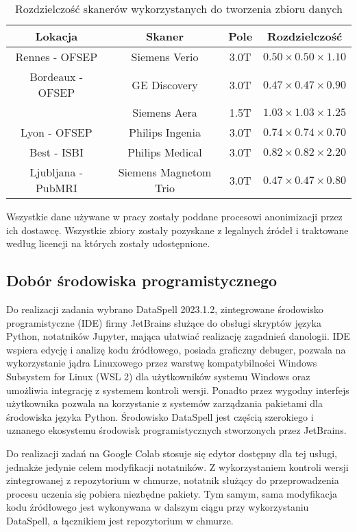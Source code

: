 \begin{table}[H]
    \centering
    \caption{Rozdzielczość skanerów wykorzystanych do tworzenia zbioru danych}
    \begin{tabular}{|c|c|c|c|}
    \hline
    Lokacja & Skaner & Pole & Rozdzielczość \\
    \hline
    Rennes - OFSEP & Siemens Verio & 3.0T & $0.50 \times 0.50 \times 1.10$  \\
    \hline
    Bordeaux - OFSEP & GE Discovery & 3.0T & $0.47 \times 0.47 \times 0.90$  \\

    & Siemens Aera & 1.5T & $1.03 \times 1.03 \times 1.25$  \\
    \hline
    Lyon - OFSEP & Philips Ingenia & 3.0T & $0.74 \times 0.74 \times 0.70$  \\
    \hline
    Best - ISBI & Philips Medical & 3.0T & $0.82 \times 0.82 \times 2.20$  \\
    \hline
    Ljubljana - PubMRI & Siemens Magnetom Trio & 3.0T & $0.47 \times 0.47 \times 0.80$  \\
    \hline
    \end{tabular}
    \label{tab:ResolutionOfDataset}
\end{table}

\par 
Wszystkie dane używane w pracy zostały poddane procesowi anonimizacji przez ich dostawcę.  
Wszystkie zbiory zostały pozyskane z legalnych źródeł i traktowane według licencji na których zostały udostępnione.




\subsection{Dobór środowiska programistycznego}
\label{sec:IDESelection}
\par
Do realizacji zadania wybrano DataSpell 2023.1.2, zintegrowane środowisko programistyczne (IDE) firmy JetBrains służące do obsługi skryptów języka Python, notatników Jupyter, mająca ułatwiać realizację zagadnień danologii. IDE wspiera edycję i analizę kodu źródłowego, posiada graficzny debuger, pozwala na wykorzystanie jądra Linuxowego przez warstwę kompatybilności Windows Subsystem for Linux (WSL 2) dla użytkowników systemu Windows oraz umożliwia integrację z systemem kontroli wersji. Ponadto przez wygodny interfejs użytkownika pozwala na korzystanie z systemów zarządzania pakietami dla środowiska języka Python. Środowisko DataSpell jest częścią szerokiego i uznanego ekosystemu środowisk programistycznych stworzonych przez JetBrains. 
\par 
Do realizacji zadań na Google Colab stosuje się edytor dostępny dla tej usługi, jednakże jedynie celem modyfikacji notatników. Z wykorzystaniem kontroli wersji zintegrowanej z repozytorium w chmurze, notatnik służący do przeprowadzenia procesu uczenia się pobiera niezbędne pakiety. Tym samym, sama modyfikacja kodu źródłowego jest wykonywana w dalszym ciągu przy wykorzystaniu DataSpell, a łącznikiem jest repozytorium w chmurze.

